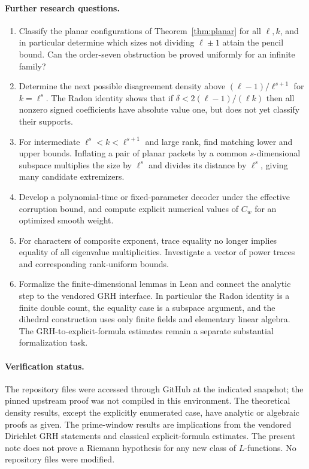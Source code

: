 \documentclass[11pt]{article}
\theoremstyle{remark}\newtheorem{remark}[theorem]{Remark}
\begin{document}
\paragraph{Further research questions.}
\begin{enumerate}
\item Classify the planar configurations of Theorem~\ref{thm:planar} for all $\ell,k$, and in particular determine which sizes not dividing $\ell\pm1$ attain the pencil bound. Can the order-seven obstruction be proved uniformly for an infinite family?
\item Determine the next possible disagreement density above $(\ell-1)/\ell^{s+1}$ for $k=\ell^s$. The Radon identity shows that if $\delta<2(\ell-1)/(\ell k)$ then all nonzero signed coefficients have absolute value one, but does not yet classify their supports.
\item For intermediate $\ell^s<k<\ell^{s+1}$ and large rank, find matching lower and upper bounds. Inflating a pair of planar packets by a common $s$-dimensional subspace multiplies the size by $\ell^s$ and divides its distance by $\ell^s$, giving many candidate extremizers.
\item Develop a polynomial-time or fixed-parameter decoder under the effective corruption bound, and compute explicit numerical values of $C_w$ for an optimized smooth weight.
\item For characters of composite exponent, trace equality no longer implies equality of all eigenvalue multiplicities. Investigate a vector of power traces and corresponding rank-uniform bounds.
\item Formalize the finite-dimensional lemmas in Lean and connect the analytic step to the vendored GRH interface. In particular the Radon identity is a finite double count, the equality case is a subspace argument, and the dihedral construction uses only finite fields and elementary linear algebra. The GRH-to-explicit-formula estimates remain a separate substantial formalization task.
\end{enumerate}

\paragraph{Verification status.} The repository files were accessed through GitHub at the indicated snapshot; the pinned upstream proof was not compiled in this environment. The theoretical density results, except the explicitly enumerated case, have analytic or algebraic proofs as given. The prime-window results are implications from the vendored Dirichlet GRH statements and classical explicit-formula estimates. The present note does not prove a Riemann hypothesis for any new class of $L$-functions. No repository files were modified.
\end{document}
